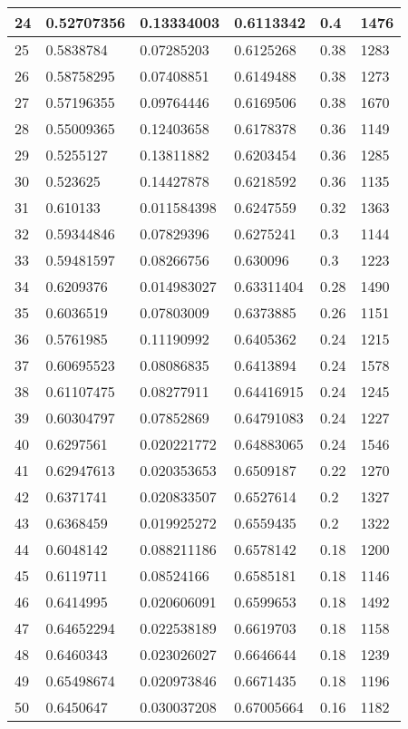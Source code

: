 \begin{longtable}{|l|l|l|l|l|l|}
24 & 0.52707356 & 0.13334003 & 0.6113342 & 0.4 & 1476 \\ \hline 
25 & 0.5838784 & 0.07285203 & 0.6125268 & 0.38 & 1283 \\ \hline 
26 & 0.58758295 & 0.07408851 & 0.6149488 & 0.38 & 1273 \\ \hline 
27 & 0.57196355 & 0.09764446 & 0.6169506 & 0.38 & 1670 \\ \hline 
28 & 0.55009365 & 0.12403658 & 0.6178378 & 0.36 & 1149 \\ \hline 
29 & 0.5255127 & 0.13811882 & 0.6203454 & 0.36 & 1285 \\ \hline 
30 & 0.523625 & 0.14427878 & 0.6218592 & 0.36 & 1135 \\ \hline 
31 & 0.610133 & 0.011584398 & 0.6247559 & 0.32 & 1363 \\ \hline 
32 & 0.59344846 & 0.07829396 & 0.6275241 & 0.3 & 1144 \\ \hline 
33 & 0.59481597 & 0.08266756 & 0.630096 & 0.3 & 1223 \\ \hline 
34 & 0.6209376 & 0.014983027 & 0.63311404 & 0.28 & 1490 \\ \hline 
35 & 0.6036519 & 0.07803009 & 0.6373885 & 0.26 & 1151 \\ \hline 
36 & 0.5761985 & 0.11190992 & 0.6405362 & 0.24 & 1215 \\ \hline 
37 & 0.60695523 & 0.08086835 & 0.6413894 & 0.24 & 1578 \\ \hline 
38 & 0.61107475 & 0.08277911 & 0.64416915 & 0.24 & 1245 \\ \hline 
39 & 0.60304797 & 0.07852869 & 0.64791083 & 0.24 & 1227 \\ \hline 
40 & 0.6297561 & 0.020221772 & 0.64883065 & 0.24 & 1546 \\ \hline 
41 & 0.62947613 & 0.020353653 & 0.6509187 & 0.22 & 1270 \\ \hline 
42 & 0.6371741 & 0.020833507 & 0.6527614 & 0.2 & 1327 \\ \hline 
43 & 0.6368459 & 0.019925272 & 0.6559435 & 0.2 & 1322 \\ \hline 
44 & 0.6048142 & 0.088211186 & 0.6578142 & 0.18 & 1200 \\ \hline 
45 & 0.6119711 & 0.08524166 & 0.6585181 & 0.18 & 1146 \\ \hline 
46 & 0.6414995 & 0.020606091 & 0.6599653 & 0.18 & 1492 \\ \hline 
47 & 0.64652294 & 0.022538189 & 0.6619703 & 0.18 & 1158 \\ \hline 
48 & 0.6460343 & 0.023026027 & 0.6646644 & 0.18 & 1239 \\ \hline 
49 & 0.65498674 & 0.020973846 & 0.6671435 & 0.18 & 1196 \\ \hline 
50 & 0.6450647 & 0.030037208 & 0.67005664 & 0.16 & 1182 \\ \hline 
\end{longtable}